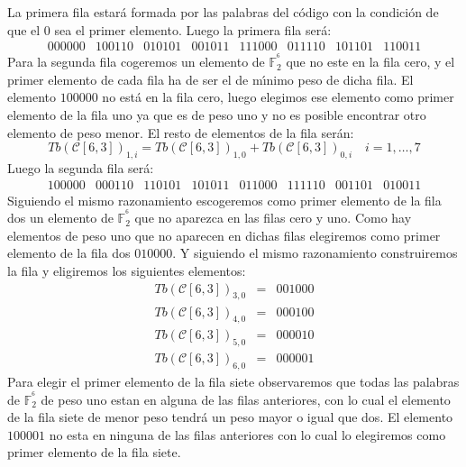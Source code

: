 La primera fila estar\'a formada por las palabras del c\'odigo con la
condici\'on de que el $0$ sea el primer elemento. Luego la primera fila
ser\'a:
\begin{displaymath}
\begin{array}{cccccccc}
000000&100110&010101&001011&111000&011110&101101&110011
\end{array}
\end{displaymath}
Para la segunda fila cogeremos un elemento de $\mathbb{F}^{^6}_2$ que no este
en la fila cero, y el primer elemento de cada fila ha de ser el de
m\'{\i}nimo peso de dicha fila. El elemento $100000$ no est\'a en la fila 
cero,
luego elegimos ese elemento como primer elemento de la fila uno ya que es de
peso uno y no es posible encontrar otro elemento de peso menor. El resto de
elementos de la fila ser\'an:
\begin{displaymath}
Tb(\mathcal{C}[6,3])_{1,i}=Tb(\mathcal{C}[6,3])_{1,0}+Tb(\mathcal{C}[6,3])_{0,
i}
\quad i=1,\dots,7
\end{displaymath}
Luego la segunda fila ser\'a:
\begin{displaymath}
\begin{array}{cccccccc}
100000&000110&110101&101011&011000&111110&001101&010011
\end{array}
\end{displaymath}
%
\newpage
%
Siguiendo el mismo razonamiento escogeremos como primer elemento de la fila 
dos un elemento de $\mathbb{F}^{^6}_2$ que no aparezca en las filas cero y uno. 
Como hay elementos de peso uno que no aparecen en dichas filas elegiremos como
primer elemento de la fila dos $010000$. Y siguiendo el mismo razonamiento
construiremos la fila y eligiremos los siguientes elementos:
\begin{eqnarray*}
Tb(\mathcal{C}[6,3])_{3,0}&=& 001000\\
Tb(\mathcal{C}[6,3])_{4,0}&=& 000100\\
Tb(\mathcal{C}[6,3])_{5,0}&=& 000010\\
Tb(\mathcal{C}[6,3])_{6,0}&=& 000001
\end{eqnarray*}
Para elegir el primer elemento de la fila siete observaremos que todas las
palabras de $\mathbb{F}^{^6}_2$ de peso uno estan en alguna de las filas
anteriores, con lo cual el elemento de la fila siete de menor peso tendr\'a un
peso mayor o igual que dos. El elemento $100001$ no esta en ninguna de las  
filas anteriores con lo cual lo elegiremos como primer elemento de la fila
siete.\\ \\ 

